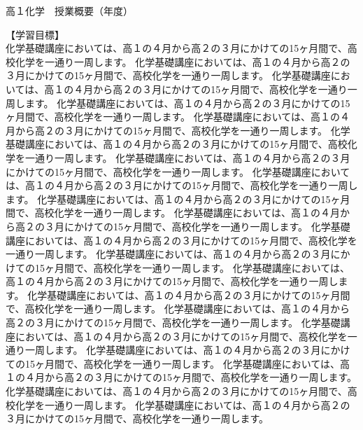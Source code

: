 \documentclass[book, twoside, paper=b5j, fleqn, jafontsize=9pt, jafontscale=1, head_space=22mm, foot_space=9mm, fore-edge=16mm, gutter=25mm, hanging_punctuation]{jlreq}
\newcommand{\aboutsection}[1]{\noindent 【#1】\\}
\begin{document}
{\HiraKakusix\fontsize{15truept}{15truept}\selectfont 高１化学　授業概要（{}年度）}

\begin{multicols*}{2}
    \aboutsection{学習目標}
    \indent 化学基礎講座においては、高１の４月から高２の３月にかけての15ヶ月間で、高校化学を一通り一周します。
    \indent 化学基礎講座においては、高１の４月から高２の３月にかけての15ヶ月間で、高校化学を一通り一周します。
    \indent 化学基礎講座においては、高１の４月から高２の３月にかけての15ヶ月間で、高校化学を一通り一周します。
    \indent 化学基礎講座においては、高１の４月から高２の３月にかけての15ヶ月間で、高校化学を一通り一周します。
    \indent 化学基礎講座においては、高１の４月から高２の３月にかけての15ヶ月間で、高校化学を一通り一周します。
    \indent 化学基礎講座においては、高１の４月から高２の３月にかけての15ヶ月間で、高校化学を一通り一周します。
    \indent 化学基礎講座においては、高１の４月から高２の３月にかけての15ヶ月間で、高校化学を一通り一周します。
    \indent 化学基礎講座においては、高１の４月から高２の３月にかけての15ヶ月間で、高校化学を一通り一周します。
    \indent 化学基礎講座においては、高１の４月から高２の３月にかけての15ヶ月間で、高校化学を一通り一周します。
    \indent 化学基礎講座においては、高１の４月から高２の３月にかけての15ヶ月間で、高校化学を一通り一周します。
    \indent 化学基礎講座においては、高１の４月から高２の３月にかけての15ヶ月間で、高校化学を一通り一周します。
    \indent 化学基礎講座においては、高１の４月から高２の３月にかけての15ヶ月間で、高校化学を一通り一周します。
    \indent 化学基礎講座においては、高１の４月から高２の３月にかけての15ヶ月間で、高校化学を一通り一周します。
    \indent 化学基礎講座においては、高１の４月から高２の３月にかけての15ヶ月間で、高校化学を一通り一周します。
    \indent 化学基礎講座においては、高１の４月から高２の３月にかけての15ヶ月間で、高校化学を一通り一周します。
    \indent 化学基礎講座においては、高１の４月から高２の３月にかけての15ヶ月間で、高校化学を一通り一周します。
    \indent 化学基礎講座においては、高１の４月から高２の３月にかけての15ヶ月間で、高校化学を一通り一周します。
    \indent 化学基礎講座においては、高１の４月から高２の３月にかけての15ヶ月間で、高校化学を一通り一周します。
    \indent 化学基礎講座においては、高１の４月から高２の３月にかけての15ヶ月間で、高校化学を一通り一周します。
    \indent 化学基礎講座においては、高１の４月から高２の３月にかけての15ヶ月間で、高校化学を一通り一周します。
\end{multicols*}
\end{document}
